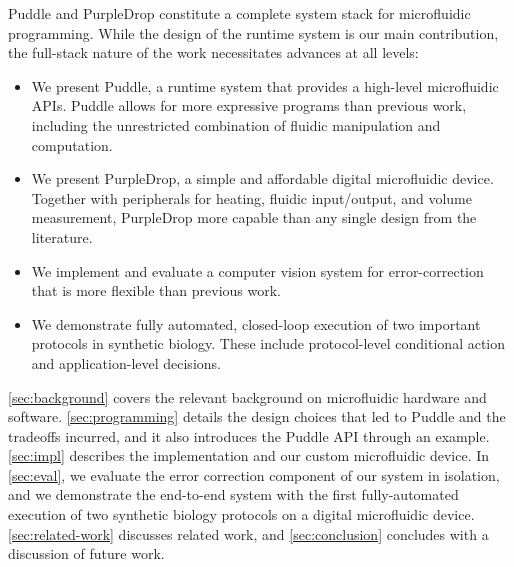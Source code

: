 \documentclass{jpaper}
\newcommand\mw[1]{\todo[color=blue!20]{\sf #1}}
\begin{document}
Puddle and PurpleDrop constitute a complete system stack for microfluidic programming.
While the design of the runtime system is our main contribution, the full-stack nature of the work necessitates advances at all levels:
\begin{itemize}
  \item We present Puddle, a runtime system that provides a high-level microfluidic APIs. Puddle allows for more expressive programs than previous work, including the unrestricted combination of fluidic manipulation and computation.
\item We present PurpleDrop, a simple and affordable digital microfluidic device. Together with peripherals for heating, fluidic input/output, and volume measurement, PurpleDrop more capable than any single design from the literature.
\item We implement and evaluate a computer vision system for error-correction that is more flexible than previous work.
\item We demonstrate fully automated, closed-loop execution of two important protocols in synthetic biology.
  These include protocol-level conditional action and application-level decisions.
\end{itemize}

\autoref{sec:background} covers the relevant background on microfluidic hardware and software.
\autoref{sec:programming} details the design choices that led to Puddle and the tradeoffs incurred, and it also introduces the Puddle API through an example.
\autoref{sec:impl} describes the implementation and our custom microfluidic device.
In \autoref{sec:eval}, we evaluate the error correction component of our system in isolation, and we demonstrate the end-to-end system with the first fully-automated execution of two synthetic biology protocols on a digital microfluidic device.
\autoref{sec:related-work} discusses related work, and \autoref{sec:conclusion} concludes with a discussion of future work.
\end{document}
